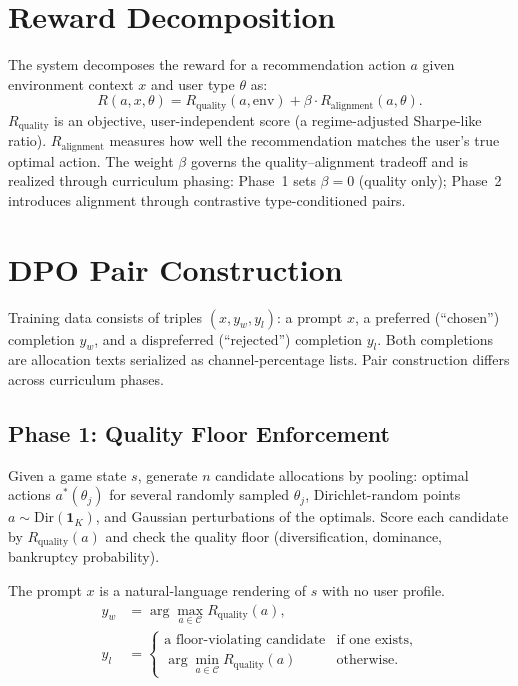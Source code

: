 \documentclass[11pt]{article}
\begin{document}
\section{Reward Decomposition}

The system decomposes the reward for a recommendation action $a$ given
environment context $x$ and user type $\theta$ as:
\begin{equation}\label{eq:reward}
  R(a, x, \theta)
  = R_{\mathrm{quality}}(a, \mathrm{env})
  + \beta \cdot R_{\mathrm{alignment}}(a, \theta).
\end{equation}
$R_{\mathrm{quality}}$ is an objective, user-independent score (a
regime-adjusted Sharpe-like ratio). $R_{\mathrm{alignment}}$ measures how
well the recommendation matches the user's true optimal action.
The weight $\beta$ governs the quality--alignment tradeoff and is realized
through curriculum phasing: Phase~1 sets $\beta = 0$ (quality only);
Phase~2 introduces alignment through contrastive type-conditioned pairs.


\section{DPO Pair Construction}

Training data consists of triples $(x, y_w, y_l)$: a prompt $x$, a
preferred (``chosen'') completion $y_w$, and a dispreferred (``rejected'')
completion $y_l$. Both completions are allocation texts serialized as
channel-percentage lists. Pair construction differs across curriculum phases.

\subsection{Phase 1: Quality Floor Enforcement}

Given a game state $s$, generate $n$ candidate allocations by pooling:
optimal actions $a^*(\theta_j)$ for several randomly sampled $\theta_j$,
Dirichlet-random points $a \sim \mathrm{Dir}(\mathbf{1}_K)$, and
Gaussian perturbations of the optimals. Score each candidate by
$R_{\mathrm{quality}}(a)$ and check the quality floor
(diversification, dominance, bankruptcy probability).

The prompt $x$ is a natural-language rendering of $s$ with no user profile.
\begin{align}
  y_w &= \arg\max_{a \in \mathcal{C}} R_{\mathrm{quality}}(a),
    \label{eq:p1-chosen} \\
  y_l &=
    \begin{cases}
      \text{a floor-violating candidate} & \text{if one exists,} \\
      \arg\min_{a \in \mathcal{C}} R_{\mathrm{quality}}(a) & \text{otherwise.}
    \end{cases}
    \label{eq:p1-rejected}
\end{align}
\end{document}
